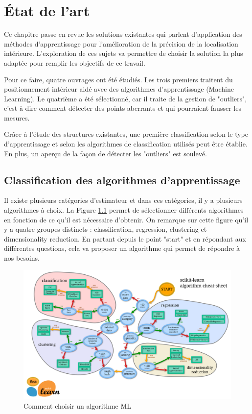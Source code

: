 \chapter{État de l'art}
Ce chapitre passe en revue les solutions existantes qui parlent d'application des méthodes d'apprentissage pour l'amélioration de la précision de la localisation intérieure. L'exploration de ces sujets va permettre de choisir la solution la plus adaptée pour remplir les objectifs de ce travail.

Pour ce faire, quatre ouvrages ont été étudiés. Les trois premiers traitent du positionnement intérieur aidé avec des algorithmes d'apprentissage (Machine Learning). Le quatrième a été sélectionné, car il traite de la gestion de "outliers", c'est à dire comment détecter des points aberrants et qui pourraient fausser les mesures. 

Grâce à l'étude des structures existantes, une première classification selon le type d'apprentissage et selon les algorithmes de classification utilisés peut être établie. En plus, un aperçu de la façon de détecter les "outliers" est soulevé.

\section{Classification des algorithmes d'apprentissage}
Il existe plusieurs catégories d'estimateur et dans ces catégories, il y a plusieurs algorithmes à choix. La Figure \ref{fig:scikiLearn} permet de sélectionner différents algorithmes en fonction de ce qu'il est nécessaire d'obtenir. On remarque sur cette figure qu'il y a quatre groupes distincts : classification, regression, clustering et dimensionality reduction. En partant depuis le point "start" et en répondant aux différentes questions, cela va proposer un algorithme qui permet de répondre à nos besoins.

\begin{figure}[htp]
 \begin{center}
  \includegraphics[scale=0.12]{figures/scikiLearn.png}
  \caption{Comment choisir un algorithme ML \cite{scikit}}
  \label{fig:scikiLearn} %
 \end{center}
\end{figure}

